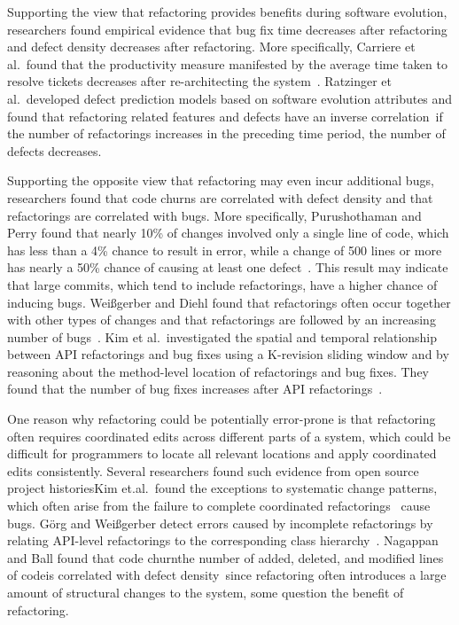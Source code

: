 Supporting the view that refactoring provides benefits during software evolution, researchers found empirical evidence that bug fix time decreases after refactoring and defect density decreases after refactoring. More specifically, Carriere et al.~found that the productivity measure manifested by the average time taken to resolve tickets decreases after re-architecting the system~\cite{Carriere2010:architecture}. Ratzinger et al.~developed defect prediction models based on software evolution attributes and found that refactoring related features and defects have an inverse correlation~\cite{Ratzinger2008:refactor}\textemdash if the number of refactorings increases in the preceding time period, the number of defects decreases. 

Supporting the opposite view that refactoring may even incur additional bugs, researchers found that code churns are correlated with defect density and that refactorings are correlated with bugs. More specifically, Purushothaman and Perry found that nearly 10\% of changes involved only a single line of code, which has less than a 4\% chance to result in error, while a change of 500 lines or more has nearly a 50\% chance of causing at least one defect~\cite{Purushothaman2005}. This result may indicate that large commits, which tend to include refactorings, have a higher chance of inducing bugs. Wei{\ss}gerber and Diehl found that refactorings often occur together with other types of changes and that refactorings are followed by an increasing number of bugs~\cite{Weissgerber2006:refactor}. Kim et al.~investigated the spatial and temporal relationship between API refactorings and bug fixes using a K-revision sliding window and by reasoning about the method-level location of refactorings and bug fixes. They found that the number of bug fixes increases after API refactorings~\cite{Kim2011:refactorbug}.  


One reason why refactoring could be potentially error-prone is that refactoring often requires coordinated edits across different parts of a system, which could be difficult for programmers to locate all relevant locations and apply coordinated edits consistently. Several researchers found such evidence from open source project histories\textemdash Kim et.al.~found the exceptions to systematic change patterns, which often arise from the failure to complete coordinated refactorings~\cite{Kim2007,Kim:2009} cause bugs. G{\"o}rg and Wei{\ss}gerber detect errors caused by incomplete refactorings by relating API-level refactorings to the corresponding class hierarchy~\cite{Gorg2005a}. Nagappan and Ball found that code churn\textemdash the number of added, deleted, and modified lines of code\textemdash is correlated with defect density~\cite{Nagappan2005}\textemdash since refactoring often introduces a large amount of structural changes to the system, some question the benefit of refactoring. 


